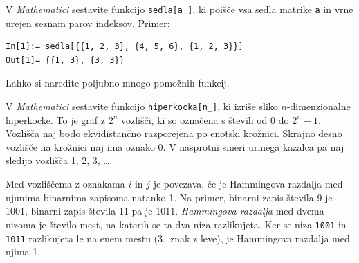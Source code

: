\documentclass[arhiv]{../izpit}
\begin{document}
V \emph{Mathematici} sestavite funkcijo \texttt{sedla[a\_]}, ki poišče vsa sedla matrike \texttt{a} in vrne urejen sez\-nam parov indeksov. Primer:
%
\begin{verbatim}
In[1]:= sedla[{{1, 2, 3}, {4, 5, 6}, {1, 2, 3}}]
Out[1]= {{1, 3}, {3, 3}}
\end{verbatim}
%
Lahko si naredite poljubno mnogo pomožnih funkcij.


V \emph{Mathematici} sestavite funkcijo \texttt{hiperkocka[n\_]}, ki izriše sliko $n$-dimenzionalne hiperkocke. To je graf z $2^n$ vozlišči, ki so označena s števili od 0 do $2^n-1$. Vozlišča naj bodo ekvidistančno razporejena po enotski krožnici. Skrajno desno vozlišče na krožnici naj ima oznako 0. V nasprotni smeri urinega kazalca pa naj sledijo vozlišča 1, 2, 3, \ldots

Med vozliščema z oznakama $i$ in $j$ je povezava, če je Hammingova razdalja med njunima binarnima zapisoma natanko 1.
Na primer, binarni zapis števila 9 je 1001, binarni zapis števila 11 pa je 1011. \emph{Hammingova razdalja} med dvema nizoma je število mest, na katerih se ta dva niza razlikujeta. Ker se niza \texttt{1001} in \texttt{1011} razlikujeta le na enem mestu (3.\ znak z leve), je Hammingova razdalja med njima 1.
\end{document}
